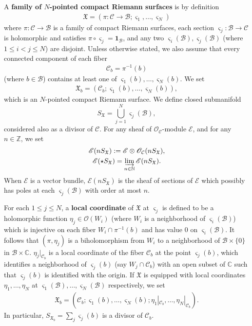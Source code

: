 \documentclass[12pt,a4paper,notitlepage]{article}
\theoremstyle{definition}
\theoremstyle{plain}
\newcommand{\fk}{\mathfrak}
\newcommand{\mc}{\mathcal}
\newcommand{\id}{\mathbf{1}}
\newcommand{\scr}{\mathscr}
\newcommand{\sgm}{\varsigma}
\newcommand{\SX}{{S_{\fk X}}}
\newcommand{\Cbb}{\mathbb C}
\newcommand{\Nbb}{\mathbb N}
\newcommand{\Zbb}{\mathbb Z}
\numberwithin{equation}{section}
\begin{document}


A \textbf{family of $N$-pointed compact Riemann surfaces} is by definition
\begin{align}
	\fk X=(\pi:\mc C\rightarrow\mc B;\sgm_1,\dots,\sgm_N)\label{eq2}	
\end{align}
where $\pi:\mc C\rightarrow\mc B$ is a family of compact Riemann surfaces, each section $\sgm_j:\mc B\rightarrow\mc C$ is holomorphic and satisfies $\pi\circ\sgm_j=\id_{\mc B}$, and any two $\sgm_i(\mc B),\sgm_j(\mc B)$ (where $1\leq i<j\leq N$) are disjoint. Unless otherwise stated, we also assume that every connected component of each fiber \index{CbXb@$\mc C_b,\fk X_b$}
\begin{align*}
	\mc C_b=\pi^{-1}(b)	
\end{align*}
(where $b\in\mc B$) contains at least one of $\sgm_1(b),\dots,\sgm_N(b)$. We set
\begin{align*}
	\fk X_b=(\mc C_b;\sgm_1(b),\dots,\sgm_N(b)),	
\end{align*}
which is an $N$-pointed compact Riemann surface. We define closed submanifold \index{SX@$\SX$}
\begin{equation*}
	\SX=\bigcup_{j=1}^N\sgm_j(\mc B),	
\end{equation*}
considered also as a divisor of $\mc C$. For any sheaf of $\scr O_{\mc C}$-module $\scr E$, and for any $n\in\Zbb$, we set \index{ES@$\scr E(n\SX),\scr E(\star\SX)$}
\begin{gather*}
	\scr E(n\SX):=\scr E\otimes\scr O_{\mc C}(n\SX),\\
	\scr E(\star\SX)=\varinjlim_{n\in\Nbb}\scr E(n\SX).
\end{gather*}
When $\scr E$ is a vector bundle, $\scr E(n\SX)$ is the sheaf of sections of $\scr E$ which possibly has poles at each $\sgm_j(\mc B)$ with order at most $n$. 




For each $1\leq j\leq N$, a \textbf{local coordinate} of $\fk X$ at $\sgm_j$ is defined to be a holomorphic function $\eta_j\in\scr O(W_i)$ (where $W_i$ is a neighborhood of $\sgm_i(\mc B)$) which is injective on each fiber $W_i\cap\pi^{-1}(b)$ and has value $0$ on $\sgm_i(\mc B)$. It follows that $(\pi,\eta_j)$ is a biholomorphism from $W_i$ to a neighborhood of $\mc B\times\{0\}$ in $\mc B\times\Cbb$. $\eta_j|_{\mc C_b}$ is a local coordinate of the fiber $\mc C_b$ at the point $\sgm_j(b)$, which identifies a neighborhood  of $\sgm_j(b)$ (say $W_j\cap\mc C_b$) with an open subset of $\Cbb$ such that $\sgm_j(b)$ is identified with the origin. If $\fk X$ is equipped with local coordinates $\eta_1,\dots,\eta_N$ at $\sgm_1(\mc B),\dots,\sgm_N(\mc B)$ respectively, we set
\begin{align*}
\fk X_b=(\mc C_b;\sgm_1(b),\dots,\sgm_N(b);\eta_1|_{\mc C_b},\dots,\eta_N|_{\mc C_b}).	
\end{align*}
In particular, $S_{\fk X_b}=\sum_j\sgm_j(b)$ is a divisor of $\mc C_b$.
\end{document}
